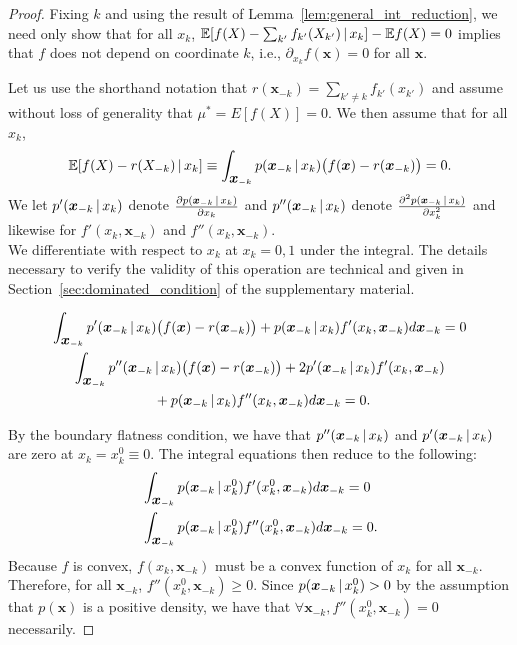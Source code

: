 \begin{proof}

Fixing $k$ and using the result of
Lemma~\ref{lem:general_int_reduction}, 
we need only show that for all $x_k$, $ {\mathbb E}[ f(X) - \sum_{k'}
f_{k'}(X_{k'}) {\,|\,} x_k] - {\mathbb E} f(X) = 0 $ 
implies that $f$ does not depend on coordinate $k$, i.e., 
$\partial_{x_k} f(\mathbf{x}) = 0$ for all $\mathbf{x}$.

Let us use the shorthand notation that $r(\mathbf{x}_{-k}) = \sum_{k'
  \neq k} f_{k'}(x_{k'})$ and assume without loss of generality that
$\mu^* = E[f(X)] = 0$. We then assume that for all $x_k$,
\begin{equation}
 {\mathbb E}[ f(X) - r(X_{-k})  {\,|\,} x_k] \equiv 
 \int_{\mbox{\boldmath $x$}_{-k}}  p(\mbox{\boldmath $x$}_{-k} {\,|\,} x_k ) 
 \big(f(\mbox{\boldmath $x$}) - r(\mbox{\boldmath $x$}_{-k}) \big) = 0.
\end{equation}
We let $p'(\mbox{\boldmath $x$}_{-k} {\,|\,} x_k)$ denote 
$\frac{\partial p(\mbox{\boldmath $\scriptstyle x$}_{-k} {\,|\,} x_k)}{\partial x_k}$ and 
$p''(\mbox{\boldmath $x$}_{-k} {\,|\,} x_k)$ denote 
$\frac{\partial^2 p(\mbox{\boldmath $\scriptstyle x$}_{-k} {\,|\,} x_k)}{\partial x_k^2}$ and
likewise for $f'(x_k, \mathbf{x}_{-k})$ and $f''(x_k,
\mathbf{x}_{-k})$. \\

We differentiate with respect to $x_k$ at $x_k = 0,1$ under the
integral. The details necessary to verify the validity of this
operation are technical and given in
Section~\ref{sec:dominated_condition} of the supplementary material.

\begin{gather}
\int_{\mbox{\boldmath $x$}_{-k}} p'(\mbox{\boldmath $x$}_{-k} {\,|\,} x_k) 
\big( f(\mbox{\boldmath $x$}) - r(\mbox{\boldmath $x$}_{-k}) \big) + 
p(\mbox{\boldmath $x$}_{-k} {\,|\,} x_k) f'(x_k, \mbox{\boldmath $x$}_{-k}) d \mbox{\boldmath $x$}_{-k}  = 0 
\label{eqn:integral1a} \\
\int_{\mbox{\boldmath $x$}_{-k}} p''(\mbox{\boldmath $x$}_{-k} {\,|\,} x_k) 
\big( f(\mbox{\boldmath $x$}) - r(\mbox{\boldmath $x$}_{-k}) \big) 
   + 2 p'(\mbox{\boldmath $x$}_{-k} {\,|\,} x_k) f'(x_k, \mbox{\boldmath $x$}_{-k}) \\
\nonumber \mbox{\ } +
p(\mbox{\boldmath $x$}_{-k} {\,|\,} x_k) f''(x_k, \mbox{\boldmath $x$}_{-k}) d\mbox{\boldmath $x$}_{-k}  = 0 .
\end{gather}

By the boundary flatness condition, we have that $p''(\mbox{\boldmath $x$}_{-k}
{\,|\,} x_k)$ and $p'(\mbox{\boldmath $x$}_{-k} {\,|\,} x_k)$ are zero at $x_k =
x_k^0 \equiv 0$. The integral equations then reduce to the following:
\begin{align}
& \int_{\mbox{\boldmath $x$}_{-k}} p(\mbox{\boldmath $x$}_{-k} {\,|\,} x^0_k) f'(x^0_k, \mbox{\boldmath $x$}_{-k}) d \mbox{\boldmath $x$}_{-k}= 0 \label{eqn:integral1b} \\
& \int_{\mbox{\boldmath $x$}_{-k}} p(\mbox{\boldmath $x$}_{-k} {\,|\,} x^0_k) f''(x^0_k, \mbox{\boldmath $x$}_{-k}) d\mbox{\boldmath $x$}_{-k} = 0.
\end{align}
Because $f$ is convex, $f(x_k, \mathbf{x}_{-k})$ must be a convex
function of 
$x_k$ for all $\mathbf{x}_{-k}$. Therefore, for all $\mathbf{x}_{-k}$,
$f''(x^0_k, \mathbf{x}_{-k}) \geq 0$. Since $p(\mbox{\boldmath $x$}_{-k} {\,|\,}
x^0_k) > 0$ by the assumption that $p(\mathbf{x})$ is a positive density, 
we have that $\forall \mathbf{x}_{-k}, f''(x^0_k, \mathbf{x}_{-k}) = 0$ necessarily.


\end{proof}
